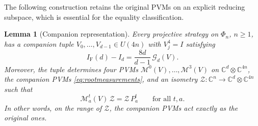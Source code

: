 \documentclass[aps,prl,reprint,superscriptaddress,longbibliography,floatfix,raggedbottom]{revtex4-2}
\newtheorem{lemma}{Lemma}
\newcommand{\C}{\mathbb C}
\newcommand{\IF}{I_{\mathrm F}}
\newcommand{\Gd}{\mathcal G_d}
\newcommand{\Zisom}{\mathcal Z}
\newcommand{\RootP}{\mathcal M}
\begin{document}
The following construction retains the original PVMs on an explicit
reducing subspace, which is essential for the equality classification.

\begin{lemma}[Companion representation]\label{lem:companion}
Every projective strategy on $\Phi_n$, $n\ge1$, has a companion
tuple $V_0,\dots,V_{d-1}\in U(4n)$ with $V_j^4=I$ satisfying
\begin{equation}\label{eq:normalization}
\IF(d)-I_d=\frac{8d}{d-1}\,\Gd(V).
\end{equation}
Moreover, the tuple determines four PVMs
$\RootP^0(V),\dots,\RootP^3(V)$ on $\C^d\otimes\C^{4n}$, the
\emph{companion PVMs} \eqref{eq:rootmeasurements}, and an isometry
$\Zisom:\C^n\to\C^d\otimes\C^{4n}$ such that
\begin{equation}\label{eq:intertwine}
\RootP^t_a(V)\,\Zisom=\Zisom\,P^t_a\qquad\text{for all }t,a. 
\end{equation}
In other words, on the range of $\Zisom$, the companion PVMs act exactly as the
original ones.
\end{lemma}
\end{document}
